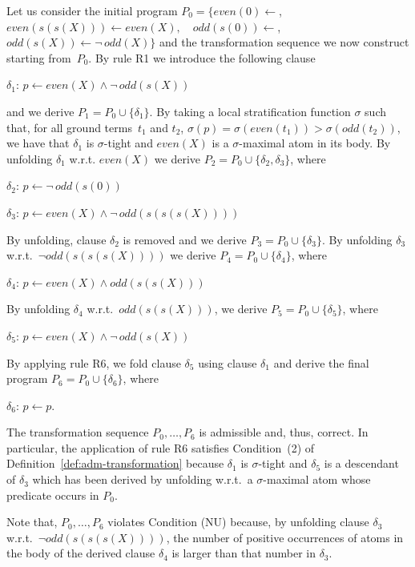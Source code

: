 \documentclass[english]{tlp}
\renewcommand{\mathit}{\displaystyle}
\begin{document}
\begin{example}\label{ex:not_seki}\nopagebreak 
Let us consider the initial program  $P_0 =
\{\mathit{even}(0)\!\leftarrow$, \ \ 
$\mathit{even}(s(s(X)))\!\leftarrow\!\mathit{even}(X),$\ \ 
$\mathit{odd}(s(0))\!\leftarrow$, \ \ 
$\mathit{odd}(s(X))\!\leftarrow\!\neg\,\mathit{odd}(X)\}$
and the transformation sequence we now construct starting from~$P_0$.
By rule R1 we introduce the following clause

$\delta_1$: $p\leftarrow \mathit{even}(X)\wedge \neg\,\mathit{odd}(s(X))$

\noindent and we derive $P_1= P_0 \cup \{\delta_1\}$. 
By taking a local stratification function $\sigma$ such that, 
for all ground terms~$t_1$ and $t_2$, $\sigma(p)\!=\!\sigma(\mathit{even}(t_1))\!>\!
\sigma(\mathit{odd}(t_2))$, we have that $\delta_1$ is \mbox{$\sigma$-tight} and
$even(X)$ is a \mbox{$\sigma$-maximal} atom in its body.
By unfolding $\delta_1$ w.r.t. $\mathit{even}(X)$ we derive 
$P_2=P_0 \cup \{\delta_2,\delta_3\}$,
where

$\delta_2$: $p\leftarrow \neg\,\mathit{odd}(s(0))$\hspace{2cm}

$\delta_3$: $p\leftarrow \mathit{even}(X)\wedge \neg\,\mathit{odd}(s(s(s(X))))$

\noindent
By unfolding, clause $\delta_2$ is removed and we derive
$P_3=P_0 \cup \{\delta_3\}$. By unfolding $\delta_3$
w.r.t.~$\neg \mathit{odd}(s(s(s(X))))$ we derive $P_4=P_0 \cup \{\delta_4\}$, where

$\delta_4$: $p\leftarrow \mathit{even}(X)\wedge \mathit{odd}(s(s(X)))$

\noindent
By unfolding
$\delta_4$ w.r.t.~$\mathit{odd}(s(s(X)))$, we derive $P_5=P_0 \cup \{\delta_5\}$, where

$\delta_5$: $p\leftarrow \mathit{even}(X)\wedge \neg\,\mathit{odd}(s(X))$

\noindent
By applying rule R6, we fold clause $\delta_5$ using
clause $\delta_1$ and derive the final program $P_6=P_0\cup\{\delta_6\}$, where

$\delta_6$: $p\leftarrow p$.

\noindent The transformation
sequence $P_0,\ldots,P_6$ is admissible and, thus, correct. In particular, the
application of rule R6 satisfies Condition~(2) of
Definition~\ref{def:adm-transformation} because $\delta_1$ is $\sigma$-tight
and $\delta_5$
is a descendant of $\delta_3$ which has been derived by unfolding 
w.r.t.~a $\sigma$-maximal atom whose predicate occurs in $P_0$. 

Note that, $P_0,\ldots,P_6$ violates Condition (NU) 
because, by unfolding clause $\delta_3$ 
w.r.t.~$\neg \mathit{odd}(s(s(s(X))))$,
the number of positive occurrences of atoms in
the body of the derived clause $\delta_4$ is larger
than that number in $\delta_3$.
\end{example}
\end{document}
